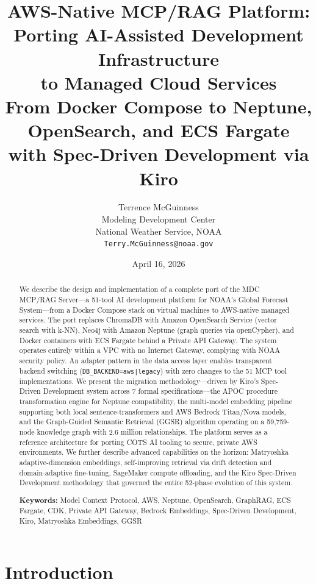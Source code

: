 \documentclass[11pt,letterpaper]{article}
\title{\textbf{AWS-Native MCP/RAG Platform:} \\
       \textbf{Porting AI-Assisted Development Infrastructure} \\
       \textbf{to Managed Cloud Services} \\[0.5em]
       \large From Docker Compose to Neptune, OpenSearch, and ECS Fargate \\
       \large with Spec-Driven Development via Kiro}
\author{
    Terrence McGuinness \\
    Modeling Development Center \\
    National Weather Service, NOAA \\
    \texttt{Terry.McGuinness@noaa.gov}
}
\date{April 16, 2026}
\begin{document}
\maketitle

\begin{abstract}
We describe the design and implementation of a complete port of the MDC
MCP/RAG Server---a 51-tool AI development platform for NOAA's Global
Forecast System---from a Docker Compose stack on virtual machines to
AWS-native managed services. The port replaces ChromaDB with Amazon
OpenSearch Service (vector search with k-NN), Neo4j with Amazon Neptune
(graph queries via openCypher), and Docker containers with ECS Fargate
behind a Private API Gateway. The system operates entirely within a VPC
with no Internet Gateway, complying with NOAA security policy. An adapter
pattern in the data access layer enables transparent backend switching
(\texttt{DB\_BACKEND=aws|legacy}) with zero changes to the 51 MCP tool
implementations. We present the migration methodology---driven by Kiro's
Spec-Driven Development system across 7 formal specifications---the APOC
procedure transformation engine for Neptune compatibility, the
multi-model embedding pipeline supporting both local sentence-transformers
and AWS Bedrock Titan/Nova models, and the Graph-Guided Semantic Retrieval
(GGSR) algorithm operating on a 59,759-node knowledge graph with 2.6
million relationships. The platform serves as a reference architecture for
porting COTS AI tooling to secure, private AWS environments. We further
describe advanced capabilities on the horizon: Matryoshka adaptive-dimension
embeddings, self-improving retrieval via drift detection and domain-adaptive
fine-tuning, SageMaker compute offloading, and the Kiro Spec-Driven
Development methodology that governed the entire 52-phase evolution of
this system.

\textbf{Keywords:} Model Context Protocol, AWS, Neptune, OpenSearch,
GraphRAG, ECS Fargate, CDK, Private API Gateway, Bedrock Embeddings,
Spec-Driven Development, Kiro, Matryoshka Embeddings, GGSR
\end{abstract}

\tableofcontents
\newpage

\section{Introduction}
\end{document}
